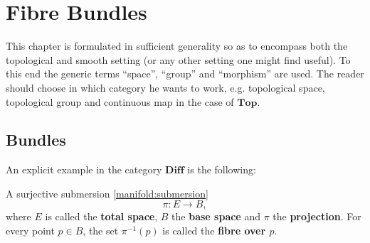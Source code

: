 \chapter{Fibre Bundles}\label{chapter:bundles}

    This chapter is formulated in sufficient generality so as to encompass both the topological and smooth setting (or any other setting one might find useful). To this end the generic terms ``space'', ``group'' and ``morphism'' are used. The reader should choose in which category he wants to work, e.g. topological space, topological group and continuous map in the case of $\mathbf{Top}$.

\section{Bundles}


    An explicit example in the category $\mathbf{Diff}$ is the following:
    \begin{example}
        A surjective submersion \ref{manifold:submersion} \[\pi:E\rightarrow B,\] where $E$ is called the \textbf{total space}, $B$ the \textbf{base space} and $\pi$ the \textbf{projection}. For every point $p\in B$, the set $\pi^{-1}(p)$ is called the \textbf{fibre over $p$}.
    \end{example}

